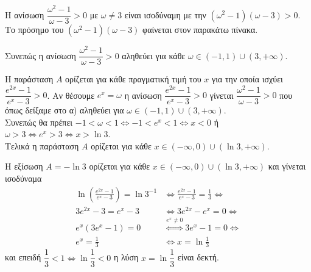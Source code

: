 \begin{alist}
\item Η ανίσωση $\dfrac{\omega^2 - 1}{\omega - 3} > 0$ με $\omega \ne 3$ είναι ισοδύναμη με την $(\omega^2 - 1)(\omega - 3) > 0$. \\
Το πρόσημο του $(\omega^2 - 1)(\omega - 3)$ φαίνεται στον παρακάτω πίνακα.
\begin{center}
\end{center}
Συνεπώς η ανίσωση $\dfrac{\omega^2 - 1}{\omega - 3} > 0$ αληθεύει για κάθε $\omega \in (-1, 1) \cup (3, +\infty)$.
\item Η παράσταση $A$ ορίζεται για κάθε πραγματική τιμή του $x$ για την οποία ισχύει $\dfrac{e^{2x} - 1}{e^x - 3} > 0$. Αν θέσουμε $e^x = \omega$ η ανίσωση $\dfrac{e^{2x} - 1}{e^x - 3} > 0$ γίνεται $\dfrac{\omega^2 - 1}{\omega - 3} > 0$ που όπως δείξαμε στο α) αληθεύει για $\omega \in (-1, 1) \cup (3, +\infty)$. \\
Συνεπώς θα πρέπει $-1 < \omega < 1 \Leftrightarrow -1 < e^x < 1 \Leftrightarrow x < 0$ ή $\omega > 3 \Leftrightarrow e^x > 3 \Leftrightarrow x > \ln 3$. \\
Τελικά η παράσταση $A$ ορίζεται για κάθε $x \in (-\infty, 0) \cup (\ln 3, +\infty)$.
\item Η εξίσωση $A = -\ln 3$ ορίζεται για κάθε $x \in (-\infty, 0) \cup (\ln 3, +\infty)$ και γίνεται ισοδύναμα
\begin{align*}
\ln\left( \frac{e^{2x} - 1}{e^x - 3} \right) = \ln 3^{-1} &\Leftrightarrow
\frac{e^{2x} - 1}{e^x - 3} = \frac{1}{3} \Leftrightarrow \\
3e^{2x} - 3 = e^x - 3 &\Leftrightarrow 
3e^{2x} - e^x = 0 \Leftrightarrow \\
e^x(3e^x - 1) = 0 &\overset{e^x \ne 0}{\Leftrightarrow}
3e^x - 1 = 0 \Leftrightarrow \\
e^x = \frac{1}{3} &\Leftrightarrow
x = \ln\frac{1}{3}
\end{align*}
και επειδή $\dfrac{1}{3} < 1 \Leftrightarrow \ln\dfrac{1}{3} < 0$ η λύση $x = \ln\dfrac{1}{3}$ είναι δεκτή.
\end{alist}

